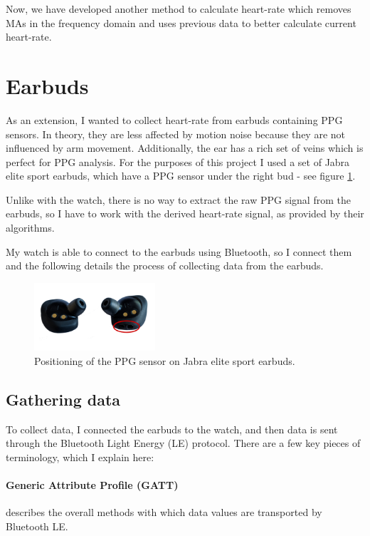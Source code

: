 \documentclass[12pt,a4paper,twoside,openany]{report}
\begin{document}
Now, we have developed another method to calculate heart-rate which
removes MAs in the frequency domain and uses previous data to better calculate
current heart-rate.

\section{Earbuds}

As an extension, I wanted to collect heart-rate from earbuds containing PPG
sensors. In theory, they 
are less affected by motion noise
because they are not influenced by arm movement. Additionally, the ear has a rich set
of veins which is perfect for PPG analysis. For the purposes of this project I used
a set of Jabra elite sport earbuds, which have a PPG sensor under the right
bud - see figure \ref{fig:jabra}. 

Unlike with the watch, there is no way to extract the raw PPG signal from the
earbuds, so I have to work with the derived heart-rate signal, as provided by
their algorithms. 

My watch is able to connect to the earbuds using Bluetooth, so I connect them
and
the following details the process of collecting data from the earbuds. 

\begin{figure}[tbh]
	\centerline{\includegraphics[width=0.4\textwidth]{figs/jabra.png}}
	\caption{Positioning of the PPG sensor on Jabra elite sport earbuds.}
	\label{fig:jabra}
\end{figure}

\subsection{Gathering data}

To collect data, I connected the earbuds to the watch, and then data is
sent through the Bluetooth Light Energy (LE) protocol. There are a few key
pieces of terminology, which I explain here:

\paragraph{Generic Attribute Profile (GATT)} describes the overall methods
with which data values are transported by Bluetooth LE.
\end{document}

